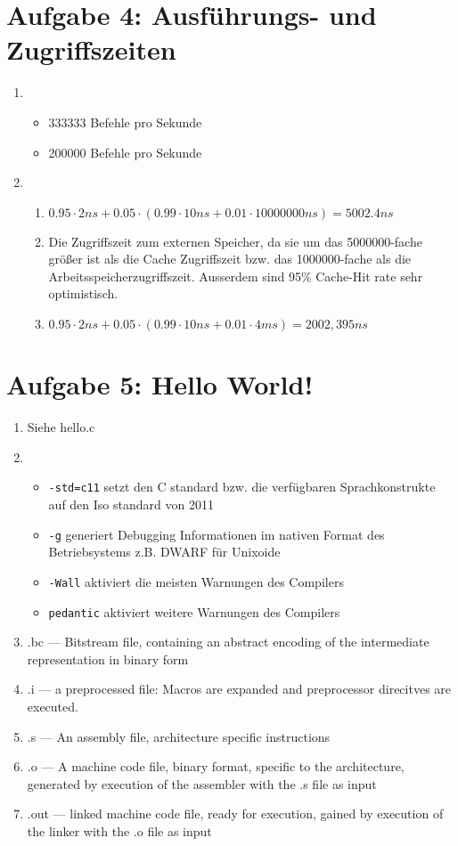 \documentclass[a4paper,10pt]{article}
\begin{document}
\section*{Aufgabe 4: Ausführungs- und Zugriffszeiten}
\begin{enumerate}
 \item 
 \begin{itemize}
  \item 333333 Befehle pro Sekunde
  \item 200000 Befehle pro Sekunde
 \end{itemize}
 
 \item 
 \begin{enumerate}
  \item $0.95 \cdot 2ns + 0.05 \cdot (0.99 \cdot 10ns + 0.01 \cdot 10000000ns) = 5002.4 ns$
  \item Die Zugriffszeit zum externen Speicher, da sie um das 5000000-fache größer ist als die Cache Zugriffszeit bzw. das 1000000-fache als die Arbeitsspeicherzugriffszeit. Ausserdem sind 95\% Cache-Hit rate sehr optimistisch.
  \item $0.95 \cdot 2ns + 0.05 \cdot (0.99 \cdot 10ns + 0.01 \cdot 4 ms) = 2002,395 ns$
 \end{enumerate}
\end{enumerate}

\section*{Aufgabe 5: Hello World!}
\begin{enumerate}
 \item Siehe hello.c
 \item 
 \begin{itemize}
  \item \texttt{-std=c11} setzt den C standard bzw. die verfügbaren Sprachkonstrukte auf den Iso standard von 2011
  \item \texttt{-g} generiert Debugging Informationen im nativen Format des Betriebsystems z.B. DWARF für Unixoide
  \item \texttt{-Wall} aktiviert die meisten Warnungen des Compilers
  \item \texttt{pedantic} aktiviert weitere Warnungen des Compilers
 \end{itemize}
    \item .bc --- Bitstream file, containing an abstract encoding of the intermediate representation in binary form
    \item .i --- a preprocessed file: Macros are expanded and preprocessor direcitves are executed.
    \item .s --- An assembly file, architecture specific instructions
    \item .o --- A machine code file, binary format, specific to the architecture, generated by execution of the assembler with the .s file as input
    \item .out --- linked machine code file, ready for execution, gained by execution of the linker with the .o file as input
 
\end{enumerate}
\end{document}
